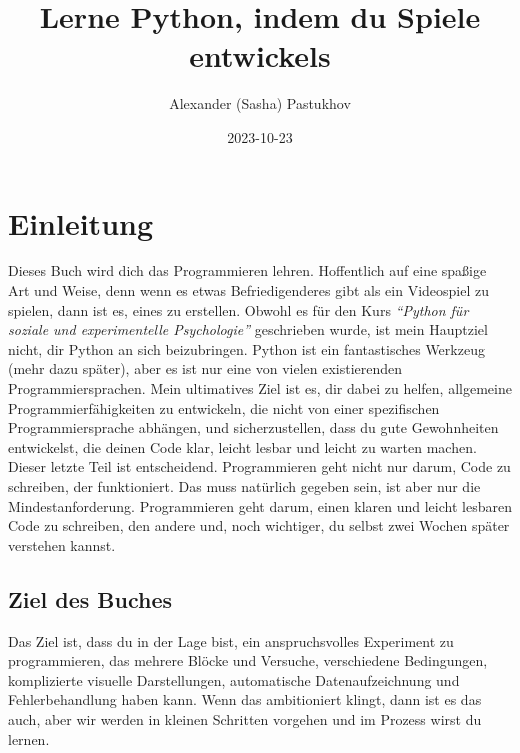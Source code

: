 \documentclass[
]{book}
\title{Lerne Python, indem du Spiele entwickels}
\author{Alexander (Sasha) Pastukhov}
\date{2023-10-23}
\begin{document}
\maketitle

{
\setcounter{tocdepth}{1}
\tableofcontents
}
\hypertarget{intro}{%
\chapter{Einleitung}\label{intro}}

Dieses Buch wird dich das Programmieren lehren. Hoffentlich auf eine spaßige Art und Weise, denn wenn es etwas Befriedigenderes gibt als ein Videospiel zu spielen, dann ist es, eines zu erstellen. Obwohl es für den Kurs \emph{``Python für soziale und experimentelle Psychologie''} geschrieben wurde, ist mein Hauptziel nicht, dir Python an sich beizubringen. Python ist ein fantastisches Werkzeug (mehr dazu später), aber es ist nur eine von vielen existierenden Programmiersprachen. Mein ultimatives Ziel ist es, dir dabei zu helfen, allgemeine Programmierfähigkeiten zu entwickeln, die nicht von einer spezifischen Programmiersprache abhängen, und sicherzustellen, dass du gute Gewohnheiten entwickelst, die deinen Code klar, leicht lesbar und leicht zu warten machen. Dieser letzte Teil ist entscheidend. Programmieren geht nicht nur darum, Code zu schreiben, der funktioniert. Das muss natürlich gegeben sein, ist aber nur die Mindestanforderung. Programmieren geht darum, einen klaren und leicht lesbaren Code zu schreiben, den andere und, noch wichtiger, du selbst zwei Wochen später verstehen kannst.

\hypertarget{ziel-des-buches}{%
\section{Ziel des Buches}\label{ziel-des-buches}}

Das Ziel ist, dass du in der Lage bist, ein anspruchsvolles Experiment zu programmieren, das mehrere Blöcke und Versuche, verschiedene Bedingungen, komplizierte visuelle Darstellungen, automatische Datenaufzeichnung und Fehlerbehandlung haben kann. Wenn das ambitioniert klingt, dann ist es das auch, aber wir werden in kleinen Schritten vorgehen und im Prozess wirst du lernen.
\end{document}
